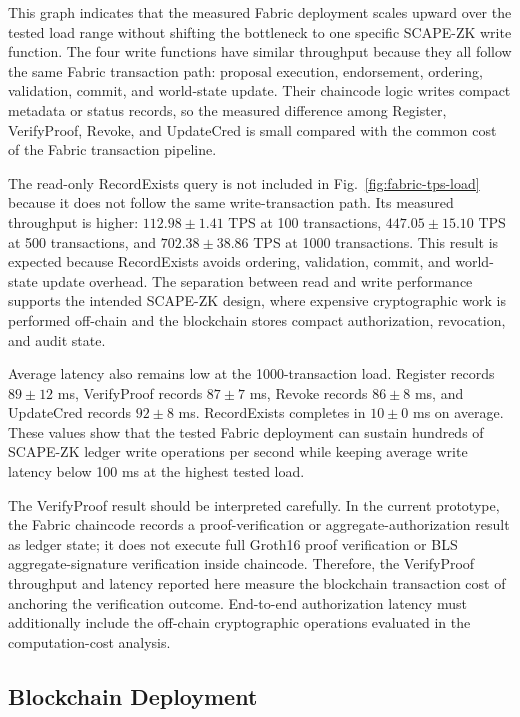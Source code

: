 \documentclass[conference]{IEEEtran}
\begin{document}
This graph indicates that the measured Fabric deployment scales upward over the tested load range without shifting the bottleneck to one specific SCAPE-ZK write function. The four write functions have similar throughput because they all follow the same Fabric transaction path: proposal execution, endorsement, ordering, validation, commit, and world-state update. Their chaincode logic writes compact metadata or status records, so the measured difference among Register, VerifyProof, Revoke, and UpdateCred is small compared with the common cost of the Fabric transaction pipeline.

The read-only RecordExists query is not included in Fig.~\ref{fig:fabric-tps-load} because it does not follow the same write-transaction path. Its measured throughput is higher: $112.98 \pm 1.41$ TPS at 100 transactions, $447.05 \pm 15.10$ TPS at 500 transactions, and $702.38 \pm 38.86$ TPS at 1000 transactions. This result is expected because RecordExists avoids ordering, validation, commit, and world-state update overhead. The separation between read and write performance supports the intended SCAPE-ZK design, where expensive cryptographic work is performed off-chain and the blockchain stores compact authorization, revocation, and audit state.

Average latency also remains low at the 1000-transaction load. Register records $89 \pm 12$ ms, VerifyProof records $87 \pm 7$ ms, Revoke records $86 \pm 8$ ms, and UpdateCred records $92 \pm 8$ ms. RecordExists completes in $10 \pm 0$ ms on average. These values show that the tested Fabric deployment can sustain hundreds of SCAPE-ZK ledger write operations per second while keeping average write latency below 100 ms at the highest tested load.

The VerifyProof result should be interpreted carefully. In the current prototype, the Fabric chaincode records a proof-verification or aggregate-authorization result as ledger state; it does not execute full Groth16 proof verification or BLS aggregate-signature verification inside chaincode. Therefore, the VerifyProof throughput and latency reported here measure the blockchain transaction cost of anchoring the verification outcome. End-to-end authorization latency must additionally include the off-chain cryptographic operations evaluated in the computation-cost analysis.

\subsection{Blockchain Deployment}
\end{document}

